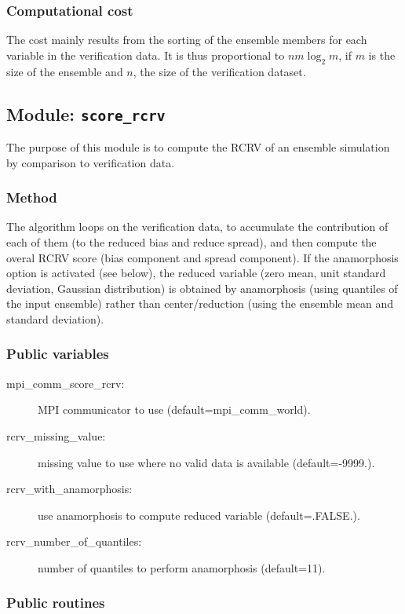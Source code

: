 \documentclass[11pt]{article}
\begin{document}
\subsubsection*{Computational cost}

The cost mainly results from the sorting of the ensemble members
for each variable in the verification data.
It is thus proportional to $n m \log_2 m$,
if $m$ is the size of the ensemble and $n$, the size of the verification dataset.

\subsection{Module: {\tt\bf score\_rcrv}}

The purpose of this module is to compute the RCRV
of an ensemble simulation by comparison to verification data.

\subsubsection*{Method}

The algorithm loops on the verification data,
to accumulate the contribution of each of them
(to the reduced bias and reduce spread),
and then compute the overal RCRV score
(bias component and spread component).
If the anamorphosis option is activated (see below),
the reduced variable (zero mean, unit standard deviation, Gaussian distribution)
is obtained by anamorphosis (using quantiles of the input ensemble)
rather than center/reduction (using the ensemble mean and standard deviation).

\subsubsection*{Public variables}

\begin{description}
\item[mpi\_comm\_score\_rcrv:] MPI communicator to use (default=mpi\_comm\_world).
\item[rcrv\_missing\_value:] missing value to use where no valid data is available (default=-9999.).
\item[rcrv\_with\_anamorphosis:] use anamorphosis to compute reduced variable (default=.FALSE.).
\item[rcrv\_number\_of\_quantiles:] number of quantiles to perform anamorphosis (default=11).
\end{description}

\subsubsection*{Public routines}
\end{document}
